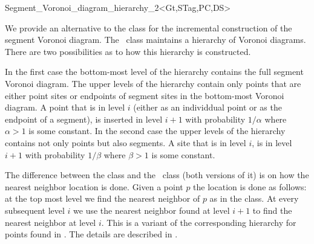 


\begin{ccRefClass}{Segment_Voronoi_diagram_hierarchy_2<Gt,STag,PC,DS>}

\ccDefinition

We provide an alternative to the class
 for the incremental
construction of the segment Voronoi diagram. The \ccRefName\ class
maintains a hierarchy of Voronoi diagrams. There are two possibilities
as to how this hierarchy is constructed.

In the first case the bottom-most level of the hierarchy contains the
full segment Voronoi diagram. The upper levels of the hierarchy
contain only points that are either point sites or endpoints of
segment sites in the bottom-most Voronoi diagram. 
A point that is in level $i$ (either as an individdual point or as the
endpoint of a segment), is inserted in level $i+1$ with probability
$1/\alpha$ where $\alpha>1$ is some constant.
In the second case the upper levels of the hierarchy contains not only
points but also segments. A site that is in level $i$, is in level
$i+1$ with probability $1/\beta$ where $\beta > 1$ is some constant.

The difference between the 
class and the \ccRefName\ class (both versions of it) is on how the
nearest neighbor location is done. Given a point $p$ the location is
done as follows: at the top most level we find the nearest neighbor of
$p$ as in the  class. At
every subsequent level $i$ we use the nearest neighbor found at level
$i+1$ to find the nearest neighbor at level $i$. This is a variant of
the corresponding hierarchy for points found in \cite{d-iirdt-98}. The
details are described in \cite{k-peasv-04}.


\end{ccRefClass}

